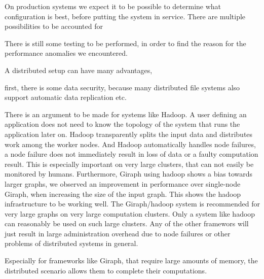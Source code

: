 On production systems we expect it to be possible to determine what configuration is best, before putting the system in service.
There are multiple possibilities to be accounted for









There is still some testing to be performed, in order to find the reason for the performance anomalies we encountered. 




A distributed setup can have many advantages,


first, there is some data security, because many distributed file systems also support automatic data replication etc.



There is an argument to be made for systems like Hadoop.
A user defining an application does not need to know the topology of the system that runs the application later on.
Hadoop transparently splits the input data and distributes work among the worker nodes.
And Hadoop automatically handles node failures, a node failure does not immediately result in loss of data or a faulty computation result.
This is especially important on very large clusters, that can not easily be monitored by humans.
Furthermore, Giraph using hadoop shows a bias towards larger graphs, we observed an improvement in performance over single-node Giraph, when increasing the size of the input graph.
This shows the hadoop infrastructure to be working well. 
The Giraph/hadoop system is recommended for very large graphs on very large computation clusters.
Only a system like hadoop can reasonably be used on such large clusters.
Any of the other framewors will just result in large administration overhead due to node failures or other problems of distributed systems in general.




Especially for frameworks like Giraph, that require large amounts of memory, the distributed scenario allows them to complete their computations. 

